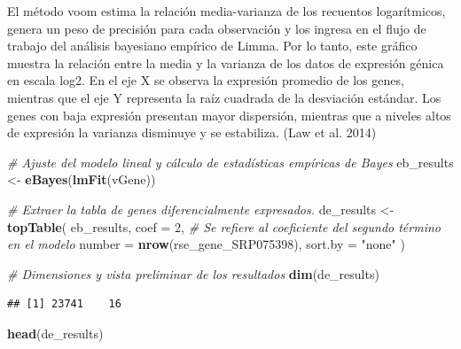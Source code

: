 \documentclass[
]{article}
\newenvironment{Shaded}{\begin{snugshade}}{\end{snugshade}}
\newcommand{\AttributeTok}[1]{\textcolor[rgb]{0.13,0.29,0.53}{#1}}
\newcommand{\CommentTok}[1]{\textcolor[rgb]{0.56,0.35,0.01}{\textit{#1}}}
\newcommand{\DecValTok}[1]{\textcolor[rgb]{0.00,0.00,0.81}{#1}}
\newcommand{\FunctionTok}[1]{\textcolor[rgb]{0.13,0.29,0.53}{\textbf{#1}}}
\newcommand{\NormalTok}[1]{#1}
\newcommand{\OtherTok}[1]{\textcolor[rgb]{0.56,0.35,0.01}{#1}}
\newcommand{\StringTok}[1]{\textcolor[rgb]{0.31,0.60,0.02}{#1}}
\begin{document}
El método voom estima la relación media-varianza de los recuentos
logarítmicos, genera un peso de precisión para cada observación y los
ingresa en el flujo de trabajo del análisis bayesiano empírico de Limma.
Por lo tanto, este gráfico muestra la relación entre la media y la
varianza de los datos de expresión génica en escala log2. En el eje X se
observa la expresión promedio de los genes, mientras que el eje Y
representa la raíz cuadrada de la desviación estándar. Los genes con
baja expresión presentan mayor dispersión, mientras que a niveles altos
de expresión la varianza disminuye y se estabiliza. (Law et al. 2014)

\begin{Shaded}
\begin{Highlighting}[]
\CommentTok{\# Ajuste del modelo lineal y cálculo de estadísticas empíricas de Bayes}
\NormalTok{eb\_results }\OtherTok{\textless{}{-}} \FunctionTok{eBayes}\NormalTok{(}\FunctionTok{lmFit}\NormalTok{(vGene))}


\CommentTok{\# Extraer la tabla de genes diferencialmente expresados.}
\NormalTok{de\_results }\OtherTok{\textless{}{-}} \FunctionTok{topTable}\NormalTok{(}
\NormalTok{    eb\_results,}
    \AttributeTok{coef =} \DecValTok{2}\NormalTok{, }\CommentTok{\# Se refiere al coeficiente del segundo término en el modelo}
    \AttributeTok{number =} \FunctionTok{nrow}\NormalTok{(rse\_gene\_SRP075398),}
    \AttributeTok{sort.by =} \StringTok{"none"}
\NormalTok{)}

\CommentTok{\# Dimensiones y vista preliminar de los resultados}
\FunctionTok{dim}\NormalTok{(de\_results)}
\end{Highlighting}
\end{Shaded}

\begin{verbatim}
## [1] 23741    16
\end{verbatim}

\begin{Shaded}
\begin{Highlighting}[]
\FunctionTok{head}\NormalTok{(de\_results)}
\end{Highlighting}
\end{Shaded}
\end{document}

